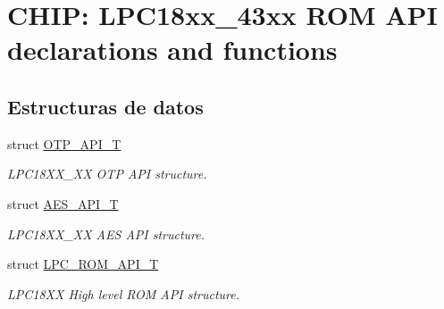 \hypertarget{group___r_o_m_a_p_i__18_x_x__43_x_x}{}\section{C\+H\+IP\+: L\+P\+C18xx\+\_\+43xx R\+OM A\+PI declarations and functions}
\label{group___r_o_m_a_p_i__18_x_x__43_x_x}
\subsection*{Estructuras de datos}
\begin{DoxyCompactItemize}
\item 
struct \hyperlink{struct_o_t_p___a_p_i___t}{O\+T\+P\+\_\+\+A\+P\+I\+\_\+T}
\begin{DoxyCompactList}\small\item\em L\+P\+C18\+X\+X\+\_\+XX O\+TP A\+PI structure. \end{DoxyCompactList}\item 
struct \hyperlink{struct_a_e_s___a_p_i___t}{A\+E\+S\+\_\+\+A\+P\+I\+\_\+T}
\begin{DoxyCompactList}\small\item\em L\+P\+C18\+X\+X\+\_\+XX A\+ES A\+PI structure. \end{DoxyCompactList}\item 
struct \hyperlink{struct_l_p_c___r_o_m___a_p_i___t}{L\+P\+C\+\_\+\+R\+O\+M\+\_\+\+A\+P\+I\+\_\+T}
\begin{DoxyCompactList}\small\item\em L\+P\+C18\+XX High level R\+OM A\+PI structure. \end{DoxyCompactList}\end{DoxyCompactItemize}
